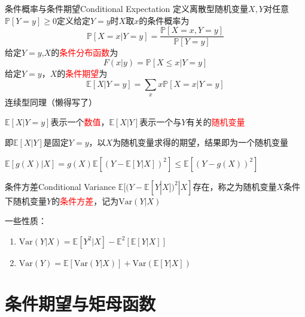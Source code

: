 \documentclass{elegantbook}
\newcommand\var{\text{Var}}
\newcommand\p{\mathbb{P}}
\newcommand\E{\mathbb{E}}
\begin{document}
\begin{definition}{条件概率与条件期望}{Conditional Expectation}
    定义离散型随机变量$X,Y$对任意$\p [Y=y]\geq 0$定义给定$Y=y$时$X$取$x$的条件概率为\[\p [X=x|Y=y]=\frac{\p [X=x,Y=y]}{\p [Y=y]}\]
    给定$Y=y$,$X$的\textcolor{red}{条件分布函数}为\[F(x|y)=\p [X\leq x|Y=y]\]
    给定$Y=y$，$X$的\textcolor{red}{条件期望}为\[\E [X|Y=y]=\sum_{x}x\p [X=x|Y=y]\]
    连续型同理（懒得写了）
\end{definition}
\begin{remark}
    $\E [X|Y=y]$表示一个\textcolor{red}{数值}，$\E [X|Y]$表示一个与$Y$有关的\textcolor{red}{随机变量}
    \par 即$\E [X|Y]$是固定$Y=y$，以$X$为随机变量求得的期望，结果即为一个随机变量
    \par $\E [g(X)|X]=g(X)$\quad $\E [(Y-\E [Y|X])^2]\leq \E [(Y-g(X))^2]$
\end{remark}

\begin{definition}{条件方差}{Conditional Variance}
    $\E [(Y-\E [Y|X])^2|X]$存在，称之为随机变量$X$条件下随机变量$Y$的\textcolor{red}{条件方差}，记为$\var (Y|X)$
    \par 一些性质：
    \begin{enumerate}
        \item $\var (Y|X)=\E [Y^2|X]-\E ^2[\E [Y|X]]$
        \item $\var (Y)=\E [\var (Y|X)]+\var (\E [Y|X])$
    \end{enumerate}
\end{definition}

\section{条件期望与矩母函数}
\end{document}

